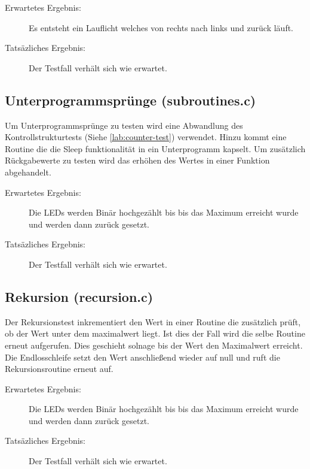             \begin{description}
                \item[Erwartetes Ergebnis:] Es entsteht ein Lauflicht welches von
                rechts nach links und zurück läuft.
                \item[Tatsäzliches Ergebnis:] Der Testfall verhält sich wie erwartet.
            \end{description}

        \subsection{Unterprogrammsprünge (subroutines.c)}
            Um Unterprogrammsprünge zu testen wird eine Abwandlung des Kontrollstrukturtests
            (Siehe \ref{lab:counter-test}) verwendet. Hinzu kommt eine Routine die
            die Sleep funktionalität in ein Unterprogramm kapselt. Um zusätzlich Rückgabewerte zu testen
            wird das erhöhen des Wertes in einer Funktion abgehandelt.

            \begin{description}
                \item[Erwartetes Ergebnis:] Die LEDs werden Binär hochgezählt bis
                bis das Maximum erreicht wurde und werden dann zurück gesetzt.
                \item[Tatsäzliches Ergebnis:] Der Testfall verhält sich wie erwartet.
            \end{description}

        \subsection{Rekursion (recursion.c)}
            Der Rekursionstest inkrementiert den Wert in einer Routine die
            zusätzlich prüft, ob der Wert unter dem maximalwert liegt.
            Ist dies der Fall wird die selbe Routine erneut aufgerufen.
            Dies geschieht solnage bis der Wert den Maximalwert erreicht.
            Die Endlosschleife setzt den Wert anschließend wieder auf null und 
            ruft die Rekursionsroutine erneut auf.

            \begin{description}
                \item[Erwartetes Ergebnis:] Die LEDs werden Binär hochgezählt bis
                bis das Maximum erreicht wurde und werden dann zurück gesetzt.
                \item[Tatsäzliches Ergebnis:] Der Testfall verhält sich wie erwartet.
            \end{description}

